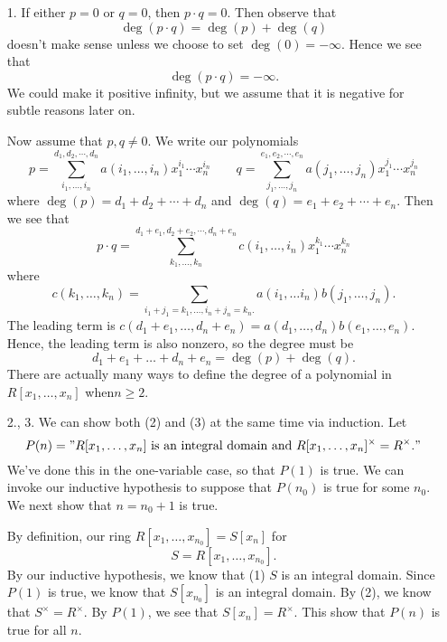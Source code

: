 \documentclass[12pt,letterpaper]{algebra_book}
\theoremstyle{definition}
\begin{document}
\begin{prf}
    \begin{itemize}
        \item[1.] If either $p = 0$ or $q = 0$, then $p \cdot q =
        0$. Then observe that 
        \[
            \deg(p \cdot q) = \deg(p) + \deg(q)
        \]
        doesn't make sense unless  we choose  to set $\deg(0) =
        -\infty$. Hence we see that
        \[
            \deg(p \cdot q) = -\infty.   
        \]
        We could make it positive infinity, but we assume that it
        is negative for subtle reasons later on. 

        Now assume that $p, q \ne 0$. We write our polynomials 
        \[
            p = \sum_{i_1, \dots, i_n}^{d_1, d_2, \cdots, d_n}a(i_1, \dots, i_n)x_1^{i_1}\cdots x_n^{i_n}
            \qquad 
            q = \sum_{j_1, \dots, j_n}^{e_1, e_2, \cdots, e_n}a(j_1, \dots, j_n)x_1^{j_1}\cdots x_n^{j_n}
        \]
        where $\deg(p) = d_1 + d_2 + \cdots + d_n$ and $\deg(q) =
        e_1 + e_2 + \cdots + e_n$. Then we see that 
        \[
            p \cdot q  
            = 
            \sum_{k_1, \dots, k_n}^{d_1 + e_1, d_2 + e_2, \cdots, d_n + e_n}c(i_1, \dots, i_n)x_1^{k_1}\cdots x_n^{k_n}  
        \]
        where 
        \[
            c(k_1, \dots, k_n) 
            = 
            \sum_{i_1+j_1 = k_1, \dots, i_n+j_n = k_n.} a(i_1,  \dots i_n)b(j_1, \dots, j_n).
        \]
        The leading term is  $c(d_1 + e_1, \dots, d_n + e_n) =
        a(d_1, \dots, d_n )b(e_1, \dots, e_n)$. Hence, the
        leading term is also nonzero, so the degree must be 
        \[
            d_1 + e_1 +  \dots + d_n + e_n = \deg(p) + \deg(q).  
        \]
        There are actually many ways to define the degree of a
        polynomial in $R[x_1, \dots, x_n]$ when$n \ge 2$. 

        \item[2., 3.] We can show both (2)  and (3) at the same
        time via induction. Let 
        \[
            P(n) = "R[x_1, \dots, x_n] \text{ is an integral domain and } R[x_1, \dots, x_n]^{\times} = R^{\times}."
        \] 
        We've done this in the one-variable case, so that $P(1)$
        is true. We can invoke our inductive hypothesis to suppose
        that $P(n_0)$ is true for some $n_0$. We next show that $n
        = n_0 + 1$ is true. 

        By definition, our ring $R[x_1, \dots, x_{n_0}] = S[x_n]$ for 
        \[
            S = R[x_1, \dots, x_{n_0}].
        \]
        By our inductive hypothesis, we know that (1)  $S$ is an
        integral domain. Since $P(1)$ is true, we know that
        $S[x_{n_0}]$ is an integral domain. By (2), we know that
        $S^\times = R^\times$. By $P(1)$, we see that $S[x_n] =
        R^\times$. This show that $P(n)$ is true for all $n$.
    \end{itemize}
\end{prf}
\end{document}
